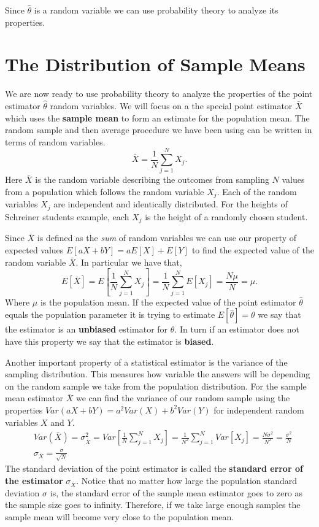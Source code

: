 \documentclass[
]{book}
\theoremstyle{definition}
\theoremstyle{definition}
\theoremstyle{definition}
\theoremstyle{definition}
\theoremstyle{remark}
\begin{document}
Since \(\hat{\theta}\) is a random variable we can use probability theory to analyze its properties.

\hypertarget{the-distribution-of-sample-means}{%
\section{The Distribution of Sample Means}\label{the-distribution-of-sample-means}}

We are now ready to use probability theory to analyze the properties of the point estimator \(\hat{\theta}\) random variables. We will focus on a the special point estimator \(\bar{X}\) which uses the \textbf{sample mean} to form an estimate for the population mean. The random sample and then average procedure we have been using can be written in terms of random variables.
\[\bar{X}=\frac{1}{N} \sum_{j=1}^N X_j.\] Here \(\bar{X}\) is the random variable describing the outcomes from sampling \(N\) values from a population which follows the random variable \(X_j\). Each of the random variables \(X_j\) are independent and identically distributed. For the heights of Schreiner students example, each \(X_j\) is the height of a randomly chosen student.

Since \(\bar{X}\) is defined as the \emph{sum} of random variables we can use our property of expected values \(E[aX+bY]=aE[X]+E[Y]\) to find the expected value of the random variable \(\bar{X}\). In particular we have that,
\[E[\bar{X}]=E\left[\frac{1}{N} \sum_{j=1}^N X_j \right]=\frac{1}{N}\sum_{j=1}^N E[X_j]=\frac{N \mu}{N}=\mu.\]
Where \(\mu\) is the population mean. If the expected value of the point estimator \(\hat{\theta}\) equals the population parameter it is trying to estimate \(E[\hat{\theta}]=\theta\) we say that the estimator is an \textbf{unbiased} estimator for \(\theta\). In turn if an estimator does not have this property we say that the estimator is \textbf{biased}.

Another important property of a statistical estimator is the variance of the sampling distribution. This measures how variable the answers will be depending on the random sample we take from the population distribution. For the sample mean estimator \(\bar{X}\) we can find the variance of our random sample using the properties \(Var(aX+bY)=a^2 Var(X)+b^2Var(Y)\) for independent random variables \(X\) and \(Y\).
\begin{align}
&Var(\bar{X})=\sigma^2_{\bar{X}}=Var\left[\frac{1}{N} \sum_{j=1}^N X_j \right]=\frac{1}{N^2}\sum_{j=1}^N Var[X_j]=\frac{N \sigma^2}{N^2}=\frac{\sigma^2}{N} \\
& \sigma_{\bar{X}}=\frac{\sigma}{\sqrt{N}}
\end{align}
The standard deviation of the point estimator is called the \textbf{standard error of the estimator} \(\sigma_{\bar{X}}\). Notice that no matter how large the population standard deviation \(\sigma\) is, the standard error of the sample mean estimator goes to zero as the sample size goes to infinity. Therefore, if we take large enough samples the sample mean will become very close to the population mean.
\end{document}
